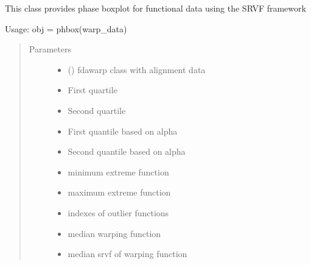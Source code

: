\documentclass[letterpaper,10pt,english]{sphinxmanual}
\begin{document}

\begin{fulllineitems}
\label{\detokenize{boxplots:boxplots.phbox}}
This class provides phase boxplot for functional data using the
SRVF framework

Usage:  obj = phbox(warp\_data)
\begin{quote}\begin{description}
\item[{Parameters}] \leavevmode\begin{itemize}
\item {} 
 ({\hyperref[\detokenize{time_warping:time_warping.fdawarp}]{}}) \textendash{} fdawarp class with alignment data

\item {} 
 \textendash{} First quartile

\item {} 
 \textendash{} Second quartile

\item {} 
 \textendash{} First quantile based on alpha

\item {} 
 \textendash{} Second quantile based on alpha

\item {} 
 \textendash{} minimum extreme function

\item {} 
 \textendash{} maximum extreme function

\item {} 
 \textendash{} indexes of outlier functions

\item {} 
 \textendash{} median warping function

\item {} 
 \textendash{} median srvf of warping function


\end{itemize}
\end{description}
\end{quote}
\end{fulllineitems}
\end{document}
